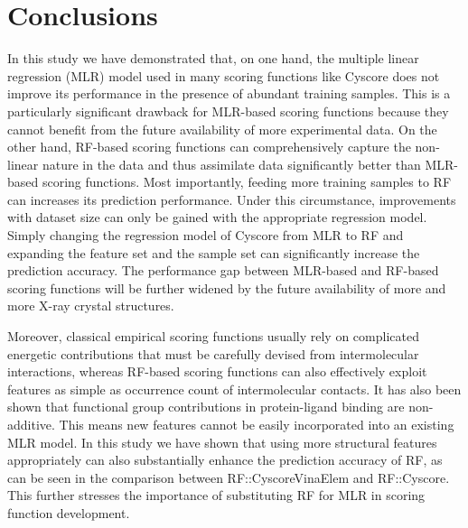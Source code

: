 \documentclass[twocolumn]{bmcart}
\begin{document}
\section*{Conclusions}

In this study we have demonstrated that, on one hand, the multiple linear regression (MLR) model used in many scoring functions like Cyscore does not improve its performance in the presence of abundant training samples. This is a particularly significant drawback for MLR-based scoring functions because they cannot benefit from the future availability of more experimental data. On the other hand, RF-based scoring functions can comprehensively capture the non-linear nature in the data and thus assimilate data significantly better than MLR-based scoring functions. Most importantly, feeding more training samples to RF can increases its prediction performance. Under this circumstance, improvements with dataset size can only be gained with the appropriate regression model. Simply changing the regression model of Cyscore from MLR to RF and expanding the feature set and the sample set can significantly increase the prediction accuracy. The performance gap between MLR-based and RF-based scoring functions will be further widened by the future availability of more and more X-ray crystal structures.

Moreover, classical empirical scoring functions usually rely on complicated energetic contributions that must be carefully devised from intermolecular interactions, whereas RF-based scoring functions can also effectively exploit features as simple as occurrence count of intermolecular contacts. It has also been shown that functional group contributions in protein-ligand binding are non-additive. This means new features cannot be easily incorporated into an existing MLR model. In this study we have shown that using more structural features appropriately can also substantially enhance the prediction accuracy of RF, as can be seen in the comparison between RF::CyscoreVinaElem and RF::Cyscore. This further stresses the importance of substituting RF for MLR in scoring function development.

\end{document}
